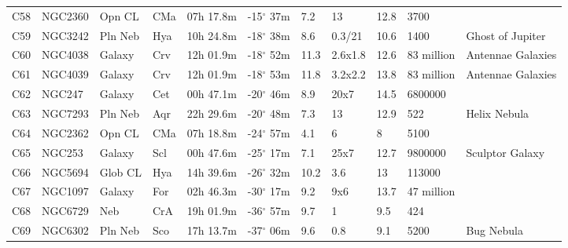 \documentclass[10pt,twoside,a4paper,english]{article}
\begin{document}
\begin{longtable}{@{}lllllllllll@{}}
C58        & NGC2360     & Opn CL     & CMa       & 07h 17.8m & -15$^{\circ}$ 37m  & 7.2       & 13                   & 12.8     & 3700                &                                 \\ 
C59        & NGC3242     & Pln Neb    & Hya       & 10h 24.8m & -18$^{\circ}$ 38m  & 8.6       & 0.3/21               & 10.6     & 1400                & Ghost of Jupiter                \\ 
C60        & NGC4038     & Galaxy     & Crv       & 12h 01.9m & -18$^{\circ}$ 52m  & 11.3      & 2.6x1.8              & 12.6     & 83 million          & Antennae Galaxies               \\ 
C61        & NGC4039     & Galaxy     & Crv       & 12h 01.9m & -18$^{\circ}$ 53m  & 11.8      & 3.2x2.2              & 13.8     & 83 million          & Antennae Galaxies               \\ 
C62        & NGC247      & Galaxy     & Cet       & 00h 47.1m & -20$^{\circ}$ 46m  & 8.9       & 20x7                 & 14.5     & 6800000             &                                 \\ 
C63        & NGC7293     & Pln Neb    & Aqr       & 22h 29.6m & -20$^{\circ}$ 48m  & 7.3       & 13                   & 12.9     & 522                 & Helix Nebula                    \\ 
C64        & NGC2362     & Opn CL     & CMa       & 07h 18.8m & -24$^{\circ}$ 57m  & 4.1       & 6                    & 8        & 5100                &                                 \\ 
C65        & NGC253      & Galaxy     & Scl       & 00h 47.6m & -25$^{\circ}$ 17m  & 7.1       & 25x7                 & 12.7     & 9800000             & Sculptor Galaxy                 \\ 
C66        & NGC5694     & Glob CL    & Hya       & 14h 39.6m & -26$^{\circ}$ 32m  & 10.2      & 3.6                  & 13       & 113000              &                                 \\ 
C67        & NGC1097     & Galaxy     & For       & 02h 46.3m & -30$^{\circ}$ 17m  & 9.2       & 9x6                  & 13.7     & 47 million          &                                 \\ 
C68        & NGC6729     & Neb        & CrA       & 19h 01.9m & -36$^{\circ}$ 57m  & 9.7       & 1                    & 9.5      & 424                 &                                 \\ 
C69        & NGC6302     & Pln Neb    & Sco       & 17h 13.7m & -37$^{\circ}$ 06m  & 9.6       & 0.8                  & 9.1      & 5200                & Bug Nebula                      \\ 

\end{longtable}
\end{document}
